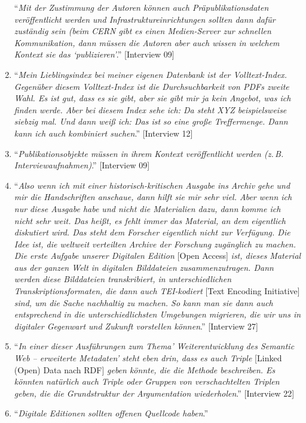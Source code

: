 \documentclass[a4paper,
fontsize=11pt,
oneside,
numbers=noperiodatend,
parskip=half-,
bibliography=totoc,
final
]{scrartcl}
\begin{document}
\begin{enumerate}
  \enquote{\emph{Mit der Zustimmung der Autoren können auch
  Präpublikationsdaten veröffentlicht werden und
  Infrastruktureinrichtungen sollten dann dafür zuständig sein (beim
  CERN gibt es einen Medien-Server zur schnellen Kommunikation, dann
  müssen die Autoren aber auch wissen in welchem Kontext sie das
  \enquote{publizieren}}.} {[}Interview 09{]}
\item
  \enquote{\emph{Mein Lieblingsindex bei meiner eigenen Datenbank ist
  der Volltext-Index. Gegenüber diesem Volltext-Index ist die
  Durchsuchbarkeit von PDFs zweite Wahl. Es ist gut, dass es sie gibt,
  aber sie gibt mir ja kein Angebot, was ich finden werde. Aber bei
  diesem Index sehe ich: Da steht XYZ beispielsweise siebzig mal. Und
  dann weiß ich: Das ist so eine große Treffermenge. Dann kann ich auch
  kombiniert suchen}.} {[}Interview 12{]}
\item
  \enquote{\emph{Publikationsobjekte müssen in ihrem Kontext
  veröffentlicht werden (z.\,B. Interviewaufnahmen)}.} {[}Interview 09{]}
\item
  \enquote{\emph{Also wenn ich mit einer historisch-kritischen Ausgabe
  ins Archiv gehe und mir die Handschriften anschaue, dann hilft sie mir
  sehr viel. Aber wenn ich nur diese Ausgabe habe und nicht die
  Materialien dazu, dann komme ich nicht sehr weit. Das heißt, es fehlt
  immer das Material, an dem eigentlich diskutiert wird. Das steht dem
  Forscher eigentlich nicht zur Verfügung. Die Idee ist, die weltweit
  verteilten Archive der Forschung zugänglich zu machen. Die erste
  Aufgabe unserer Digitalen Edition} {[}Open Access{]} \emph{ist, dieses
  Material aus der ganzen Welt in digitalen Bilddateien
  zusammenzutragen. Dann werden diese Bilddateien transkribiert, in
  unterschiedlichen Transkriptionsformaten, die dann auch TEI-kodiert}
  {[}Text Encoding Initiative{]} \emph{sind, um die Sache nachhaltig zu
  machen. So kann man sie dann auch entsprechend in die
  unterschiedlichsten Umgebungen migrieren, die wir uns in digitaler
  Gegenwart und Zukunft vorstellen können}.} {[}Interview 27{]}
\item
  \enquote{\emph{In einer dieser Ausführungen zum Thema'
  Weiterentwicklung des Semantic Web -- erweiterte Metadaten' steht eben
  drin, dass es auch Triple} {[}Linked (Open) Data nach RDF{]}
  \emph{geben könnte, die die Methode beschreiben. Es könnten natürlich
  auch Triple oder Gruppen von verschachtelten Triplen geben, die die
  Grundstruktur der Argumentation wiederholen}.} {[}Interview 22{]}
\item
  \enquote{\emph{Digitale Editionen sollten offenen Quellcode haben}.}

\end{enumerate}
\end{document}
